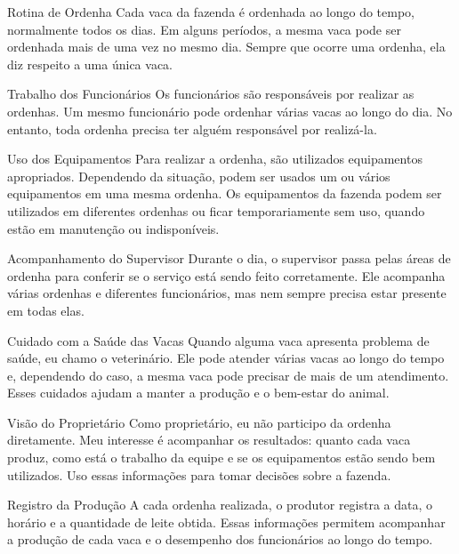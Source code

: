 \documentclass[12pt]{article}
\begin{document}
\begin{block}{Rotina de Ordenha}
Cada vaca da fazenda é ordenhada ao longo do tempo, normalmente todos os dias.
Em alguns períodos, a mesma vaca pode ser ordenhada mais de uma vez no mesmo dia.
Sempre que ocorre uma ordenha, ela diz respeito a uma única vaca.
\end{block}

\begin{block}{Trabalho dos Funcionários}
Os funcionários são responsáveis por realizar as ordenhas.
Um mesmo funcionário pode ordenhar várias vacas ao longo do dia.
No entanto, toda ordenha precisa ter alguém responsável por realizá-la.
\end{block}

\begin{block}{Uso dos Equipamentos}
Para realizar a ordenha, são utilizados equipamentos apropriados.
Dependendo da situação, podem ser usados um ou vários equipamentos em uma mesma ordenha.
Os equipamentos da fazenda podem ser utilizados em diferentes ordenhas ou
ficar temporariamente sem uso, quando estão em manutenção ou indisponíveis.
\end{block}
\begin{block}{Acompanhamento do Supervisor}
Durante o dia, o supervisor passa pelas áreas de ordenha para conferir se
o serviço está sendo feito corretamente.
Ele acompanha várias ordenhas e diferentes funcionários, mas nem sempre
precisa estar presente em todas elas.
\end{block}
\begin{block}{Cuidado com a Saúde das Vacas}
Quando alguma vaca apresenta problema de saúde, eu chamo o veterinário.
Ele pode atender várias vacas ao longo do tempo e, dependendo do caso,
a mesma vaca pode precisar de mais de um atendimento.
Esses cuidados ajudam a manter a produção e o bem-estar do animal.
\end{block}
\begin{block}{Visão do Proprietário}
Como proprietário, eu não participo da ordenha diretamente.
Meu interesse é acompanhar os resultados: quanto cada vaca produz,
como está o trabalho da equipe e se os equipamentos estão sendo bem utilizados.
Uso essas informações para tomar decisões sobre a fazenda.
\end{block}

\begin{block}{Registro da Produção}
A cada ordenha realizada, o produtor registra a data, o horário e a quantidade
de leite obtida.
Essas informações permitem acompanhar a produção de cada vaca e o desempenho
dos funcionários ao longo do tempo.
\end{block}
\end{document}
